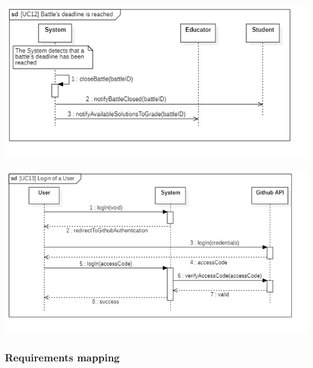 \documentclass{article}
\begin{document}
\begin{center}
    \includegraphics[width=\linewidth]{uc12.jpg}
  \label{fig:uc12}
\end{center}

\begin{center}
    \includegraphics[width=\linewidth]{uc13.jpg}
  \label{fig:uc13}
\end{center}

\subsubsection{Requirements mapping}
\end{document}
